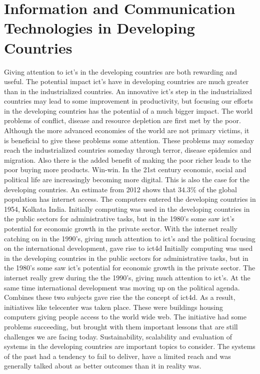 \section{Information and Communication Technologies in Developing Countries}
Giving attention to \gls{ict}'s in the developing countries are both rewarding and useful. 
The potential impact \gls{ict}'s have in developing countries are much greater than in the industrialized countries. 
An innovative \gls{ict}'s step in the industrialized countries may lead to some improvement in productivity, but focusing our efforts in the developing countries has the potential of a much bigger impact.
The world problems of conflict, disease and resource depletion are first met by the poor. 
Although the more advanced economies of the world are not primary victims, it is beneficial to give these problems some attention.
These problems may someday reach the industrialized countries someday through terror, disease epidemics and migration. 
Also there is the added benefit of making the poor richer leads to the poor buying more products. Win-win.
In the 21st century economic, social and political life are increasingly becoming more digital. 
This is also the case for the developing countries. An estimate from 2012 shows that  $34.3\%$ of the global population has internet access.
The computers entered the developing countries in 1954, Kolkata India.
Initially computing was used in the developing countries in the public sectors for administrative tasks, but in the 1980's some saw \gls{ict}'s potential for economic growth in the private sector.
With the internet really catching on in the 1990's, giving much attention to \gls{ict}'s and the political focusing on the international development, gave rise to \gls{ict4d}
Initially computing was used in the developing countries in the public sectors for administrative tasks, but in the 1980's some saw \gls{ict}'s potential for economic growth in the private sector.
The internet really grew during the the 1990's, giving much attention to \gls{ict}'s.
At the same time international development was moving up on the political agenda.
Combines these two subjects gave rise the the concept of \gls{ict4d}.
As a result, initiatives like telecenter was taken place.
These were buildings housing computers giving people access to the world wide web.
The initiative had some problems succeeding, but brought with them important lessons that are still challenges we are facing today.
Sustainability, scalability and evaluation of systems in the developing countries are important topics to consider.
The systems of the past had a tendency to fail to deliver, have a limited reach and was generally talked about as better outcomes than it in reality was.

